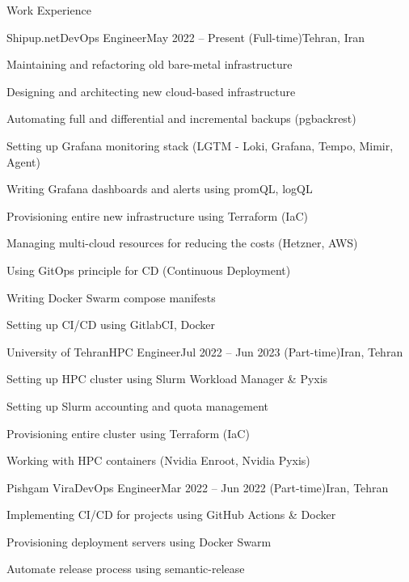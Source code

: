 \documentclass[]{main}
\begin{document}
\begin{section}{Work Experience}
 \begin{subsection}{Shipup.net}{DevOps Engineer}{May 2022 -- Present (Full-time)}{Tehran, Iran}
     \item Maintaining and refactoring old bare-metal infrastructure
     \item Designing and architecting new cloud-based infrastructure
     \item Automating full and differential and incremental backups (pgbackrest)
     \item Setting up Grafana monitoring stack (LGTM - Loki, Grafana, Tempo, Mimir, Agent)
     \item Writing Grafana dashboards and alerts using promQL, logQL
     \item Provisioning entire new infrastructure using Terraform (IaC)
     \item Managing multi-cloud resources for reducing the costs (Hetzner, AWS)
     \item Using GitOps principle for CD (Continuous Deployment)
     \item Writing Docker Swarm compose manifests
     \item Setting up CI/CD using GitlabCI, Docker
 \end{subsection}

 \begin{subsection}{University of Tehran}{HPC Engineer}{Jul 2022 -- Jun 2023 (Part-time)}{Iran, Tehran}
     \item Setting up HPC cluster using Slurm Workload Manager \& Pyxis
     \item Setting up Slurm accounting and quota management
     \item Provisioning entire cluster using Terraform (IaC)
     \item Working with HPC containers (Nvidia Enroot, Nvidia Pyxis)
 \end{subsection}

 \begin{subsection}{Pishgam Vira}{DevOps Engineer}{Mar 2022 -- Jun 2022 (Part-time)}{Iran, Tehran}
     \item Implementing CI/CD for projects using GitHub Actions \& Docker
     \item Provisioning deployment servers using Docker Swarm
     \item Automate release process using semantic-release
 \end{subsection}


\end{section}
\end{document}
